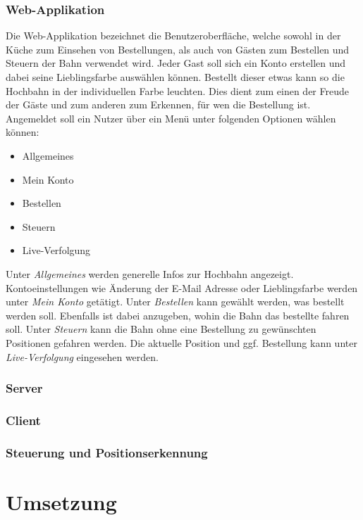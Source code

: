 \subsection{Web-Applikation}
Die Web-Applikation bezeichnet die Benutzeroberfläche, welche sowohl in der Küche zum Einsehen von Bestellungen, als auch von Gästen zum Bestellen und Steuern der Bahn verwendet wird. Jeder Gast soll sich ein Konto erstellen und dabei seine Lieblingsfarbe auswählen können.
Bestellt dieser etwas kann so die Hochbahn in der individuellen Farbe leuchten. Dies dient zum einen der Freude der Gäste und zum anderen zum Erkennen, für wen die Bestellung ist. Angemeldet soll ein Nutzer über ein Menü unter folgenden Optionen
wählen können:
\begin{itemize}
	\item Allgemeines
	\item Mein Konto
	\item Bestellen
	\item Steuern
	\item Live-Verfolgung
\end{itemize}
Unter \textit{Allgemeines} werden generelle Infos zur Hochbahn angezeigt. Kontoeinstellungen wie Änderung der E-Mail Adresse oder Lieblingsfarbe werden unter \textit{Mein Konto} getätigt. Unter \textit{Bestellen} kann gewählt werden, was bestellt werden soll.
Ebenfalls ist dabei anzugeben, wohin die Bahn das bestellte fahren soll. Unter \textit{Steuern} kann die Bahn ohne eine Bestellung zu gewünschten Positionen gefahren werden. Die aktuelle Position und ggf. Bestellung kann unter \textit{Live-Verfolgung} eingesehen werden.
\subsection{Server}
\subsection{Client}
\subsection{Steuerung und Positionserkennung}

\chapter{Umsetzung}
